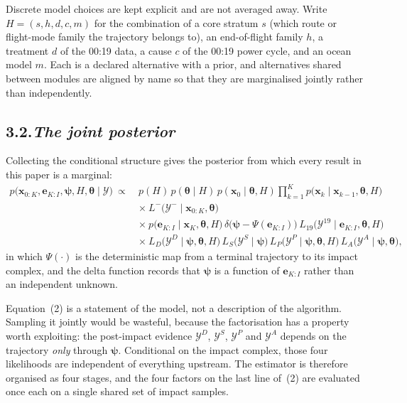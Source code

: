 \documentclass[12pt,a4paper]{article}
\newcommand{\Ev}{\mathcal{Y}}
\newcommand{\state}{\mathbf{x}}
\newcommand{\impact}{\boldsymbol{\psi}}
\newcommand{\traj}{\mathbf{e}}
\newcommand{\nuis}{\boldsymbol{\theta}}
\begin{document}
Discrete model choices are kept explicit and are not averaged away. Write
$H = (s, h, d, c, m)$ for the combination of a core stratum $s$ (which route or flight-mode
family the trajectory belongs to), an end-of-flight family $h$, a treatment $d$ of the 00:19
data, a cause $c$ of the 00:19 power cycle, and an ocean model $m$. Each is a declared
alternative with a prior, and alternatives shared between modules are aligned by name so that
they are marginalised jointly rather than independently.

\subsection*{3.2.\quad \textit{The joint posterior}}

Collecting the conditional structure gives the posterior from which every result in this paper
is a marginal:
%
\begin{equation}
\begin{split}
p\bigl(\state_{0:K},\traj_{K:I},\impact,H,\nuis \mid \Ev\bigr) \ \propto\ &
 p(H)\,p(\nuis \mid H)\,p(\state_0 \mid \nuis, H)
 \prod_{k=1}^{K} p\bigl(\state_k \mid \state_{k-1}, \nuis, H\bigr)\\[2pt]
&\times\ L^{-}\bigl(\Ev^{-} \mid \state_{0:K}, \nuis\bigr)\\[2pt]
&\times\ p\bigl(\traj_{K:I} \mid \state_K, \nuis, H\bigr)\,
          \delta\bigl(\impact - \Psi(\traj_{K:I})\bigr)\,
          L_{19}\bigl(\Ev^{19} \mid \traj_{K:I}, \nuis, H\bigr)\\[2pt]
&\times\ L_{D}\bigl(\Ev^{D} \mid \impact, \nuis, H\bigr)\,
          L_{S}\bigl(\Ev^{S} \mid \impact\bigr)\,
          L_{P}\bigl(\Ev^{P} \mid \impact, \nuis, H\bigr)\,
          L_{A}\bigl(\Ev^{A} \mid \impact, \nuis\bigr),
\end{split}
\end{equation}
%
in which $\Psi(\cdot)$ is the deterministic map from a terminal trajectory to its impact
complex, and the delta function records that $\impact$ is a function of $\traj_{K:I}$ rather
than an independent unknown.

Equation~(2) is a statement of the model, not a description of the algorithm. Sampling it
jointly would be wasteful, because the factorisation has a property worth exploiting: the
post-impact evidence $\Ev^{D}$, $\Ev^{S}$, $\Ev^{P}$ and $\Ev^{A}$ depends on the trajectory
\emph{only} through $\impact$. Conditional on the impact complex, those four likelihoods are
independent of everything upstream. The estimator is therefore organised as four stages, and
the four factors on the last line of~(2) are evaluated once each on a single shared set of
impact samples.
\end{document}
